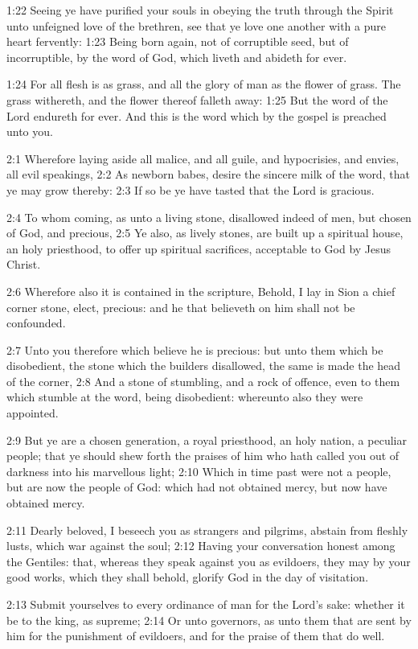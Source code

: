 1:22 Seeing ye have purified your souls in obeying the truth through
the Spirit unto unfeigned love of the brethren, see that ye love one
another with a pure heart fervently: 1:23 Being born again, not of
corruptible seed, but of incorruptible, by the word of God, which
liveth and abideth for ever.

1:24 For all flesh is as grass, and all the glory of man as the flower
of grass. The grass withereth, and the flower thereof falleth away:
1:25 But the word of the Lord endureth for ever. And this is the word
which by the gospel is preached unto you.

2:1 Wherefore laying aside all malice, and all guile, and hypocrisies,
and envies, all evil speakings, 2:2 As newborn babes, desire the
sincere milk of the word, that ye may grow thereby: 2:3 If so be ye
have tasted that the Lord is gracious.

2:4 To whom coming, as unto a living stone, disallowed indeed of men,
but chosen of God, and precious, 2:5 Ye also, as lively stones, are
built up a spiritual house, an holy priesthood, to offer up spiritual
sacrifices, acceptable to God by Jesus Christ.

2:6 Wherefore also it is contained in the scripture, Behold, I lay in
Sion a chief corner stone, elect, precious: and he that believeth on
him shall not be confounded.

2:7 Unto you therefore which believe he is precious: but unto them
which be disobedient, the stone which the builders disallowed, the
same is made the head of the corner, 2:8 And a stone of stumbling, and
a rock of offence, even to them which stumble at the word, being
disobedient: whereunto also they were appointed.

2:9 But ye are a chosen generation, a royal priesthood, an holy
nation, a peculiar people; that ye should shew forth the praises of
him who hath called you out of darkness into his marvellous light;
2:10 Which in time past were not a people, but are now the people of
God: which had not obtained mercy, but now have obtained mercy.

2:11 Dearly beloved, I beseech you as strangers and pilgrims, abstain
from fleshly lusts, which war against the soul; 2:12 Having your
conversation honest among the Gentiles: that, whereas they speak
against you as evildoers, they may by your good works, which they
shall behold, glorify God in the day of visitation.

2:13 Submit yourselves to every ordinance of man for the Lord's sake:
whether it be to the king, as supreme; 2:14 Or unto governors, as unto
them that are sent by him for the punishment of evildoers, and for the
praise of them that do well.

